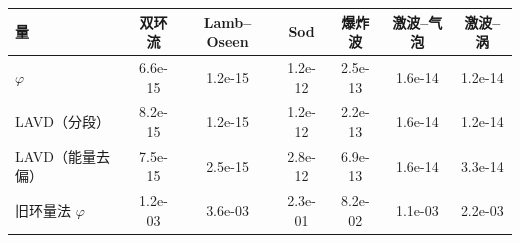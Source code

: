 \begin{tabular}{lcccccc}\toprule 量 & 双环流 & Lamb–Oseen & Sod & 爆炸波 & 激波–气泡 & 激波–涡\\\midrule
$\varphi$ & 6.6e-15 & 1.2e-15 & 1.2e-12 & 2.5e-13 & 1.6e-14 & 1.2e-14\\
LAVD（分段） & 8.2e-15 & 1.2e-15 & 1.2e-12 & 2.2e-13 & 1.6e-14 & 1.2e-14\\
LAVD（能量去偏） & 7.5e-15 & 2.5e-15 & 2.8e-12 & 6.9e-13 & 1.6e-14 & 3.3e-14\\
旧环量法 $\varphi$ & 1.2e-03 & 3.6e-03 & 2.3e-01 & 8.2e-02 & 1.1e-03 & 2.2e-03\\
\bottomrule\end{tabular}